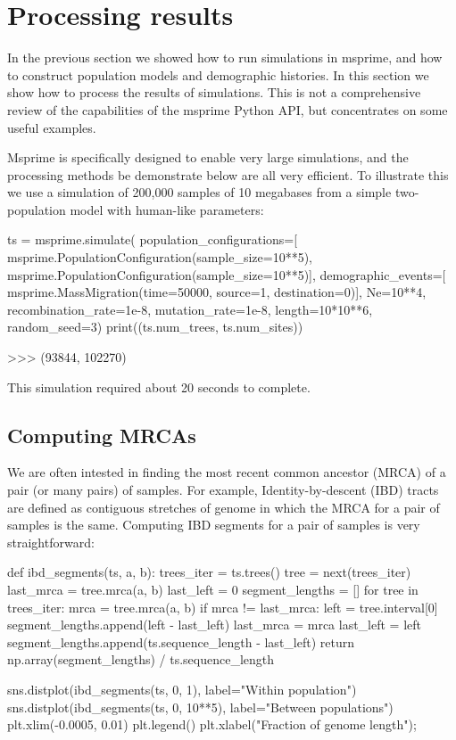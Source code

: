 \documentclass[graybox]{svmult}
\begin{document}

\section{Processing results}\label{processing-results}

In the previous section we showed how to run simulations in msprime, and
how to construct population models and demographic histories. In this
section we show how to process the results of simulations. This is not a
comprehensive review of the capabilities of the msprime Python API, but
concentrates on some useful examples.

Msprime is specifically designed to enable very large simulations, and
the processing methods be demonstrate below are all very efficient. To
illustrate this we use a simulation of 200,000 samples of 10 megabases
from a simple two-population model with human-like parameters:

\begin{pythoncode}
ts = msprime.simulate(
    population_configurations=[
        msprime.PopulationConfiguration(sample_size=10**5),
        msprime.PopulationConfiguration(sample_size=10**5)],
    demographic_events=[
        msprime.MassMigration(time=50000, source=1, destination=0)],
    Ne=10**4, recombination_rate=1e-8, mutation_rate=1e-8, length=10*10**6,
    random_seed=3)
print((ts.num_trees, ts.num_sites))

>>> (93844, 102270)
\end{pythoncode}

This simulation required about 20 seconds to complete.


\subsection{Computing MRCAs}\label{computing-mrcas}

We are often intested in finding the most recent common ancestor (MRCA)
of a pair (or many pairs) of samples. For example, Identity-by-descent
(IBD) tracts are defined as contiguous stretches of genome in which the
MRCA for a pair of samples is the same. Computing IBD segments for a
pair of samples is very straightforward:

\begin{pythoncode}
def ibd_segments(ts, a, b):
    trees_iter = ts.trees()
    tree = next(trees_iter)
    last_mrca = tree.mrca(a, b)
    last_left = 0
    segment_lengths = []
    for tree in trees_iter:
        mrca = tree.mrca(a, b)
        if mrca != last_mrca:
            left = tree.interval[0]
            segment_lengths.append(left - last_left)
            last_mrca = mrca
            last_left = left
    segment_lengths.append(ts.sequence_length - last_left)
    return np.array(segment_lengths) / ts.sequence_length

sns.distplot(ibd_segments(ts, 0, 1), label="Within population")
sns.distplot(ibd_segments(ts, 0, 10**5), label="Between populations")
plt.xlim(-0.0005, 0.01)
plt.legend()
plt.xlabel("Fraction of genome length");
\end{pythoncode}
\end{document}

